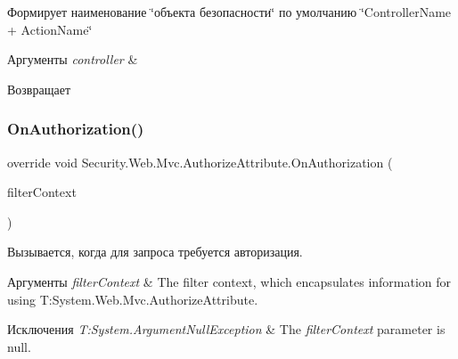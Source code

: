 Формирует наименование \char`\"{}объекта безопасности\char`\"{} по умолчанию \char`\"{}\+Controller\+Name + Action\+Name\char`\"{} 


\begin{DoxyParams}{Аргументы}
{\em controller} & \\
\hline
\end{DoxyParams}
\begin{DoxyReturn}{Возвращает}

\end{DoxyReturn}
\mbox{\label{class_security_1_1_web_1_1_mvc_1_1_authorize_attribute_ae216cd1b433a5b95fd9d3cefbc32cf31}} 
\subsubsection{\texorpdfstring{On\+Authorization()}{OnAuthorization()}}
{\footnotesize\ttfamily override void Security.\+Web.\+Mvc.\+Authorize\+Attribute.\+On\+Authorization (\begin{DoxyParamCaption}\item[{Authorization\+Context}]{filter\+Context }\end{DoxyParamCaption})}



Вызывается, когда для запроса требуется авторизация. 


\begin{DoxyParams}{Аргументы}
{\em filter\+Context} & The filter context, which encapsulates information for using T\+:\+System.\+Web.\+Mvc.\+Authorize\+Attribute.\\
\hline
\end{DoxyParams}

\begin{DoxyExceptions}{Исключения}
{\em T\+:\+System.\+Argument\+Null\+Exception} & The {\itshape filter\+Context}  parameter is null.\\
\hline
\end{DoxyExceptions}
\mbox{\label{class_security_1_1_web_1_1_mvc_1_1_authorize_attribute_a4f2d79c5650a37b2ca66c70924cce936}} 
